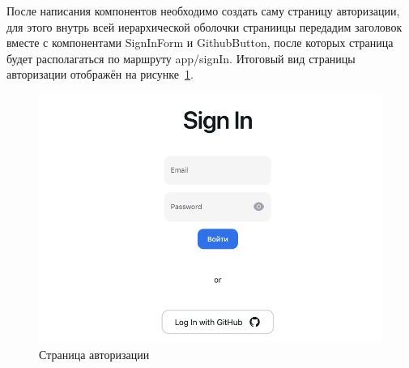 \documentclass[master, och, pract]{SCWorks}
\begin{document}
После написания компонентов необходимо создать саму страницу авторизации, для этого внутрь всей иерархической оболочки страниицы передадим заголовок вместе с компонентами SignInForm и GithubButton, после которых страница будет располагаться по маршруту app/signIn. Итоговый вид страницы авторизации отображён на рисунке~\ref{fig:1}. 
\begin{figure}[!ht]
    \centering
    \includegraphics[width=12cm]{images/image-signin.png}
    \caption{\label{fig:1}%
        Страница авторизации}
\end{figure}
\end{document}
